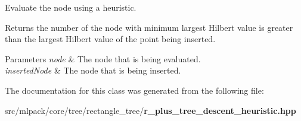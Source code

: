 Evaluate the node using a heuristic. 

Returns the number of the node with minimum largest Hilbert value is greater than the largest Hilbert value of the point being inserted.


\begin{DoxyParams}{Parameters}
{\em node} & The node that is being evaluated. \\
\hline
{\em inserted\+Node} & The node that is being inserted. \\
\hline
\end{DoxyParams}


The documentation for this class was generated from the following file\+:\begin{DoxyCompactItemize}
\item 
src/mlpack/core/tree/rectangle\+\_\+tree/{\bf r\+\_\+plus\+\_\+tree\+\_\+descent\+\_\+heuristic.\+hpp}\end{DoxyCompactItemize}
